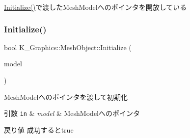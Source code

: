 \mbox{\hyperlink{class_k___graphics_1_1_mesh_object_a248233630419973244851f5d2070b5aa}{Initialize()}}で渡した\+Mesh\+Modelへのポインタを開放している 

\mbox{\label{class_k___graphics_1_1_mesh_object_a248233630419973244851f5d2070b5aa}} 
\subsubsection{\texorpdfstring{Initialize()}{Initialize()}}
{\footnotesize\ttfamily bool K\+\_\+\+Graphics\+::\+Mesh\+Object\+::\+Initialize (\begin{DoxyParamCaption}\item[{\mbox{\hyperlink{class_k___graphics_1_1_mesh_model}{Mesh\+Model}} $\ast$}]{model }\end{DoxyParamCaption})}



Mesh\+Modelへのポインタを渡して初期化 


\begin{DoxyParams}[1]{引数}
\mbox{\tt in}  & {\em model} & Mesh\+Modelへのポインタ \\
\hline
\end{DoxyParams}
\begin{DoxyReturn}{戻り値}
成功するとtrue 
\end{DoxyReturn}
\mbox{\label{class_k___graphics_1_1_mesh_object_a049000c7a45b4119fa4523ad1705bb9a}} 
